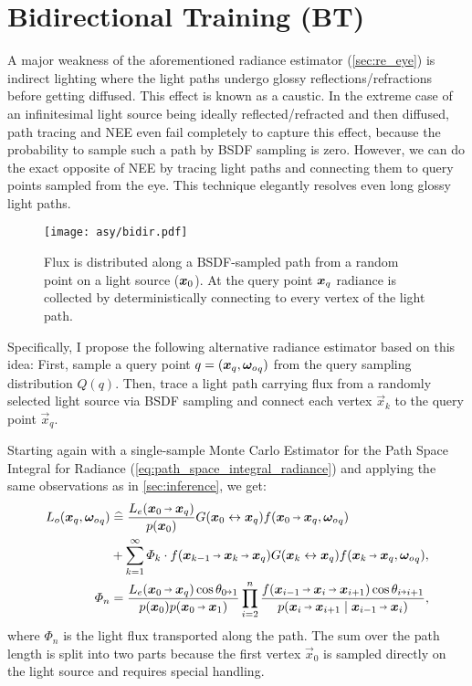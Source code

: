 \section{Bidirectional Training (BT)}
\label{sec:re_bidir}
A major weakness of the aforementioned radiance estimator (\cref{sec:re_eye}) is indirect lighting where the light paths undergo glossy reflections/refractions before getting diffused.
This effect is known as a caustic.
In the extreme case of an infinitesimal light source being ideally reflected/refracted and then diffused, path tracing and NEE even fail completely to capture this effect, because the probability to sample such a path by BSDF sampling is zero. %
However, we can do the exact opposite of NEE by tracing light paths and connecting them to query points sampled from the eye.
This technique elegantly resolves even long glossy light paths.

\begin{figure}[ht]
    \centering
    \texttt{[image: asy/bidir.pdf]}
    \caption{Flux is distributed along a BSDF-sampled path from a random point on a light source ($\bm{x}_0$). At the query point $\bm{x}_q$ radiance is collected by deterministically connecting to every vertex of the light path.}
    \label{fig:bidir}
\end{figure}
Specifically, I propose the following alternative radiance estimator based on this idea:
First, sample a query point $q = (\bm{x}_q, {\bm{\omega}_o}_q)$ from the query sampling distribution $Q(q)$.
Then, trace a light path carrying flux from a randomly selected light source via BSDF sampling and connect each vertex $\vec{x}_k$ to the query point $\vec{x}_q$.

Starting again with a single-sample Monte Carlo Estimator for the Path Space Integral for Radiance (\cref{eq:path_space_integral_radiance}) and applying the same observations as in \cref{sec:inference}, we get:
\begin{equation}
\label{eq:bidir}
\begin{aligned}
    L_o(\vec{x}_q, \wo_q)
    &\hateq \frac{L_e(\pdir{0}{q})}{p(\x_0)} \G{0}{q} f(\pdir{0}{q}, \wo_q) \\
    &+ \sum_{k=1}^{\infty} \Phi_k \cdot \f{k-1}{k}{q} \G{k}{q} f(\pdir{k}{q}, \wo_q), \\
    \Phi_n &= \frac{L_e(\pdir{0}{q}) \cos \theta_{0 \veryshortarrow 1}}{p(\x_0) p(\pdir{0}{1})} \prod_{i=2}^{n} \frac{f(\ptrip{i-1}{i}{i+1}) \cos \theta_{i \veryshortarrow i+1}}{p(\pdir{i}{i+1} \mid \pdir{i-1}{i})},
\end{aligned}
\end{equation}
where $\Phi_n$ is the light flux transported along the path.
The sum over the path length is split into two parts because the first vertex $\vec{x}_0$ is sampled directly on the light source and requires special handling.

